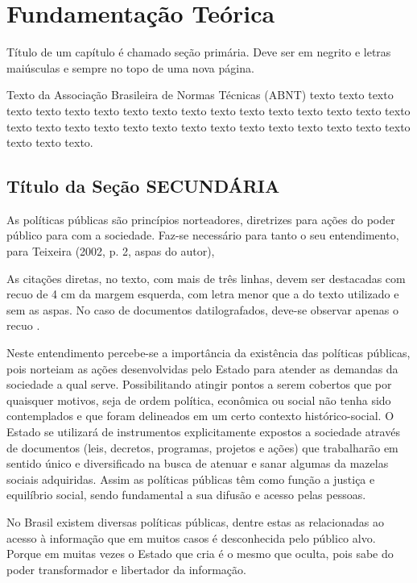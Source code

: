 \chapter{Fundamentação Teórica} \label{cha:fundamentacao}

Título de um capítulo é chamado seção primária. Deve ser em negrito e letras maiúsculas e sempre no topo de uma nova página. 

Texto da Associação Brasileira de Normas Técnicas (ABNT) texto texto texto texto texto texto texto texto texto texto texto texto texto texto texto texto texto texto texto texto texto texto texto texto texto texto texto texto texto texto texto texto texto 
texto.


\section{Título da Seção SECUNDÁRIA}
As políticas públicas são princípios norteadores, diretrizes para ações do 
poder público para com a sociedade. Faz-se necessário para tanto o seu 
entendimento, para Teixeira (2002, p. 2, aspas do autor),

\begin{citacao}
As citações diretas, no texto, com mais de três linhas, devem ser
destacadas com recuo de 4 cm da margem esquerda, com letra menor que a do texto
utilizado e sem as aspas. No caso de documentos datilografados, deve-se
observar apenas o recuo \cite[5.3]{NBR10520:2002}.
\end{citacao}

Neste entendimento percebe-se a importância da existência das políticas 
públicas, pois norteiam as ações desenvolvidas pelo Estado para atender as 
demandas da sociedade a qual serve. Possibilitando atingir pontos a serem cobertos 
que por quaisquer motivos, seja de ordem política, econômica ou social não tenha 
sido contemplados e que foram delineados em um certo contexto histórico-social. O 
Estado se utilizará de instrumentos explicitamente expostos a sociedade através de 
documentos (leis, decretos, programas, projetos e ações) que trabalharão em 
sentido único e diversificado na busca de atenuar e sanar algumas da mazelas 
sociais adquiridas. Assim as políticas públicas têm como função a justiça e equilíbrio 
social, sendo fundamental a sua difusão e acesso pelas pessoas. 

No Brasil existem diversas políticas públicas, dentre estas as relacionadas ao 
acesso à informação que em muitos casos é desconhecida pelo público alvo. Porque 
em muitas vezes o Estado que cria é o mesmo que oculta, pois sabe do poder 
transformador e libertador da informação. 


